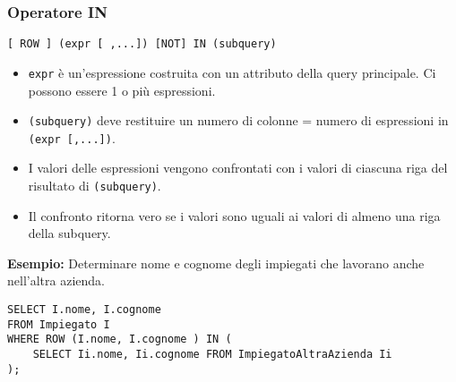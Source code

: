 \documentclass[a4paper, 10pt, titlepage]{article}
\begin{document}
	\subsubsection*{Operatore IN}
		\begin{lstlisting}
[ ROW ] (expr [ ,...]) [NOT] IN (subquery)
		\end{lstlisting}
		
		\begin{itemize}
				\item \lstinline|expr| è un’espressione costruita con un attributo della query principale.
			Ci possono essere 1 o più espressioni.
			
				\item \lstinline|(subquery)| deve restituire un numero di colonne = numero di
			espressioni in \lstinline|(expr [,...])|.
			
				\item I valori delle espressioni vengono confrontati con i valori di ciascuna riga
			del risultato di \lstinline|(subquery)|.
			
				\item Il confronto ritorna vero se i valori sono uguali ai valori di almeno una
			riga della subquery.
			\end{itemize} \medskip 
		\textbf{Esempio:} Determinare nome e cognome degli impiegati che lavorano anche nell'altra azienda.
		\begin{lstlisting}
SELECT I.nome, I.cognome
FROM Impiegato I
WHERE ROW (I.nome, I.cognome ) IN (
    SELECT Ii.nome, Ii.cognome FROM ImpiegatoAltraAzienda Ii
);
		\end{lstlisting}
		
\end{document}
